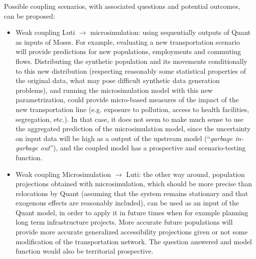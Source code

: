 \documentclass[11pt]{article}
\begin{document}
Possible coupling scenarios, with associated questions and potential outcomes, can be proposed:
\begin{itemize}
	\item Weak coupling Luti $\rightarrow$ microsimulation: using sequentially outputs of Quant as inputs of Moses. For example, evaluating a new transportation scenario will provide predictions for new populations, employments and commuting flows. Distributing the synthetic population and its movements conditionally to this new distribution (respecting reasonably some statistical properties of the original data, what may pose difficult synthetic data generation problems), and running the microsimulation model with this new parametrization, could provide micro-based measures of the impact of the new transportation line (e.g. exposure to pollution, access to health facilities, segregation, etc.). In that case, it does not seem to make much sense to use the aggregated prediction of the microsimulation model, since the uncertainty on input data will be high as a output of the upstream model (``\textit{garbage in-garbage out}''), and the coupled model has a prospective and scenario-testing function.
	\item Weak coupling Microsimulation $\rightarrow$ Luti: the other way around, population projections obtained with microsimulation, which should be more precise than relocations by Quant (assuming that the system remains stationary and that exogenous effects are reasonably included), can be used as an input of the Quant model, in order to apply it in future times when for example planning long term infrastructure projects. More accurate future populations will provide more accurate generalized accessibility projections given or not some modification of the transportation network. The question answered and model function would also be territorial prospective. %

\end{itemize}
\end{document}
